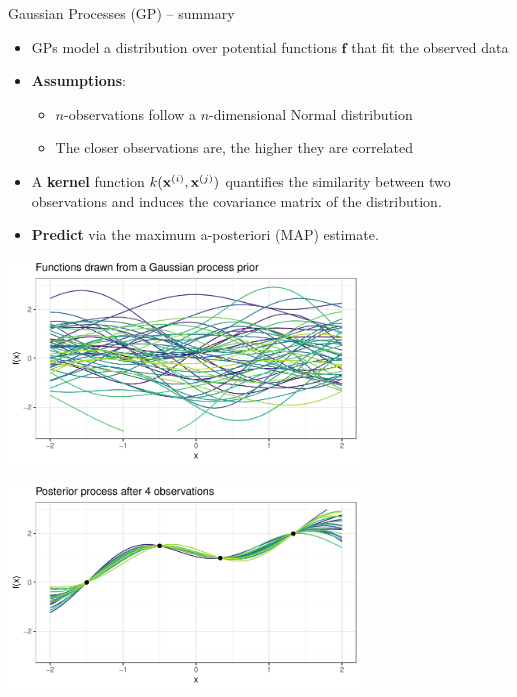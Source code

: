 
\begin{frame}{Gaussian Processes (GP) -- summary}

   

\medskip

\begin{itemize}
  \item GPs model a distribution over potential functions $\bm{f}$ that fit the observed data
  \item \textbf{Assumptions}:
  \begin{itemize}
     \item $n$-observations follow a $n$-dimensional Normal distribution
     \item The closer observations are, the higher they are correlated
  \end{itemize}
  \item A \textbf{kernel} function $k(\mathbf{x}^{(i)}, \mathbf{x}^{(j)})$ quantifies the similarity between two observations and induces the covariance matrix of the distribution. 
  \item \textbf{Predict} via the maximum a-posteriori (MAP) estimate.
\end{itemize}


\medskip

\begin{minipage}[b]{0.5\textwidth}
  \centering
  \includegraphics[width=0.7\textwidth]{figure/gp-prior} \\
\end{minipage}%
\begin{minipage}[b]{0.5\textwidth}
\centering
  \includegraphics[width=0.7\textwidth]{figure/gp-posterior}
\end{minipage}

\end{frame}

